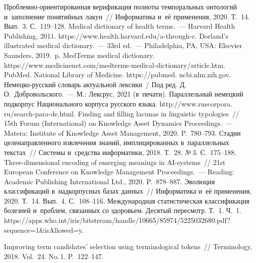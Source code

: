 \begin{multicols}{2}
{{\begin{thebibliography}{99}
 Проб\-лем\-но-ори\-ен\-ти\-ро\-ван\-ная верификация полноты 
темпоральных онтологий и~заполнение понятийных лакун~// Информатика и~её 
применения, 2020. Т.~14. Вып.~3. С.~119--128.
Medical dictionary of health terms.~--- Harvard Health Publishing, 2011. {\sf 
https://www.health.harvard.edu/\linebreak a-through-c}.
Dorland's illustrated medical dictionary.~--- 33rd ed.~--- Philadelphia, PA, USA: Elsevier Saunders, 2019.~p.
MedTerms medical dictionary. {\sf  
https://www.\linebreak medicinenet.com/medterms-medical-dictionary/article.\linebreak htm}.
PubMed. National Library of Medicine. {\sf https://pubmed. ncbi.nlm.nih.gov}.
Немецко-русский словарь актуальной лексики~/ Под ред. Д.\,О.~Добровольского.~--- М.: 
Лексрус, 2021 (в~печати).
Параллельный немецкий подкорпус Национального корпуса русского языка. {\sf 
http://www.ruscorpora. ru/search-para-de.html}.
 Finding and filling lacunas in linguistic typologies~// 15th  Forum 
(International)  on Knowledge Asset Dynamics Proceedings.~--- Matera: Institute of 
Knowledge Asset Management, 2020. P.~780--793.
 Стадии целенаправленного извлечения знаний, имплицированных 
в~параллельных текстах~// Системы и~средства информатики, 2018. Т.~28. №\,3.  
С.~175--188.
 Three-dimensional encoding of emerging meanings in AI-systems~// 21st 
European Conference on Knowledge Management Proceedings.~--- Reading: Academic 
Publishing International Ltd., 2020. P.~878--887.
 Эволюция классификаций 
в~надкорпусных базах данных~// Информатика и~её применения, 2020. Т.~14. Вып.~4. 
С.~108--116.
Международная статистическая классификация болезней
и~проб\-лем, связанных со здоровьем. Десятый пересмотр.
Т.~1. Ч.~1. {\sf 
https://apps.who.int/iris/\linebreak bitstream/handle/10665/85974/5225032680.pdf?seque\linebreak nce=1\&isAllowed=y}.


 Improving term candidates' selection using 
terminological tokens~// Terminology, 2018. Vol.~24. No.\,1. P.~122--147.


\end{thebibliography}}}
\end{multicols}
